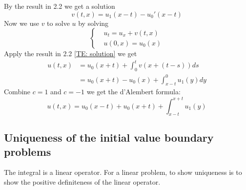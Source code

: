 \documentclass[a4paper,11pt,oneside,fleqn]{book}
\theoremstyle{definition}
\theoremstyle{remark}
\begin{document}
By the result in 2.2 we get a solution
\begin{equation*}
	v(t, x) = u_1(x - t) - u_0'(x - t)
\end{equation*}
Now we use $v$ to solve $u$ by solving
\begin{equation*}
\left\{
\begin{aligned}
	&u_t = u_x + v(t, x)\\
	&u(0, x) = u_0(x)
\end{aligned}
\right.
\end{equation*}
Apply the result in 2.2 \ref{TE: solution} we get
\begin{align*}
	u(t, x) &= u_0(x + t) + \int_0^t v(x + (t-s))ds\\
			&=u_0(x + t)  - u_0(x) + \int_{x - t}^0 u_1(y)dy
\end{align*}
Combine $c = 1$ and $c = -1$ we get the d'Alembert formula:
\begin{equation} \label{d'Alembert}
	u(t, x) = u_0(x-t) + u_0(x+t) + \int_{x-t}^{x+t} u_1(y)
\end{equation}

\subsection{Uniqueness of the initial value boundary problems}
The integral is a linear operator. For a linear problem, to show uniqueness is to show the positive definiteness of the linear operator.
\end{document}
